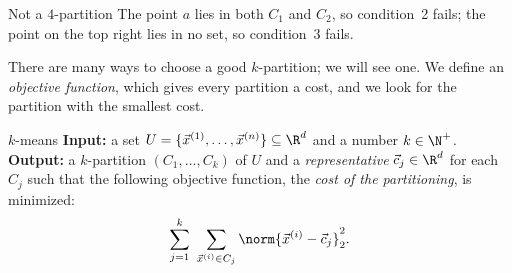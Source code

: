 \documentclass[a4paper,12pt,oneside]{report}
\begin{document}
\begin{minipage}[t]{0.485\textwidth}
\begin{framedexample}{Not a $4$-partition}
The point $a$ lies in both $C_1$ and $C_2$, so condition~2 fails; the
point on the top right lies in no set, so condition~3 fails.
\begin{center}
\end{center}
\end{framedexample}
\end{minipage}
\endgroup

There are many ways to choose a good $k$-partition; we will see one.
We define an \emph{objective function}, which gives every partition a
cost, and we look for the partition with the smallest cost.

\begin{framedproblem}{$k$-means}\label{prob:k-means}
\textbf{Input:} a set $U=\{\vec x^{(1)},\ldots,\vec x^{(n)}\}\subseteq\R^d$
and a number $k\in\N^{+}$.\\
\textbf{Output:} a $k$-partition $(C_1,\ldots,C_k)$ of $U$ and a
\emph{representative} $\vec c_j\in\R^d$ for each $C_j$ such that the
following objective function, the \emph{cost of the partitioning}, is
minimized:
\[
  \sum_{j=1}^{k}\ \sum_{\vec x^{(i)}\in C_j}
  \norm{\vec x^{(i)}-\vec c_j}_2^2 .
\]
\end{framedproblem}
\end{document}
